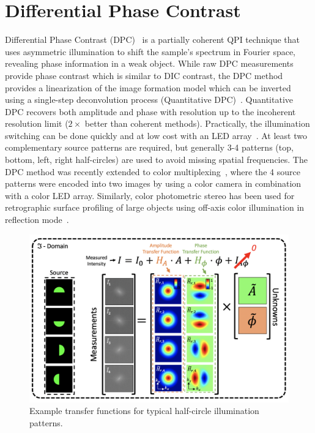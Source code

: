 \section{Differential Phase Contrast}
Differential Phase Contrast (DPC)~\cite{Hamilton1984a,mehta2009quantitative,Tian14,tian2015quantitative} is a partially coherent QPI technique that uses asymmetric illumination to shift the sample's spectrum in Fourier space, revealing phase information in a weak object. While raw DPC measurements provide phase contrast which is similar to DIC contrast, the DPC method provides a linearization of the image formation model which can be inverted using a single-step deconvolution process (Quantitative DPC)~\cite{mehta2009quantitative,tian2015quantitative}. Quantitative DPC recovers both amplitude and phase with resolution up to the incoherent resolution limit ($2\times$ better than coherent methods). Practically, the illumination switching can be done quickly and at low cost with an LED array~\cite{Tian14,zijiMulti,tian2015quantitative}. At least two complementary source patterns are required, but generally 3-4 patterns (top, bottom, left, right half-circles) are used to avoid missing spatial frequencies. The DPC method was recently extended to color multiplexing~\cite{lee2015color}, where the 4 source patterns were encoded into two images by using a color camera in combination with a color LED array. Similarly, color photometric stereo has been used for retrographic surface profiling of large objects using off-axis color illumination in reflection mode~\cite{johnson2009retrographic}.

\begin{figure}[h]
\centering
\includegraphics[width=1\textwidth]{figures/fig_phase_dpc_transfer.png}
\caption{\label{fig:dpc_transfer} Example transfer functions for typical half-circle illumination patterns.}
\end{figure}

